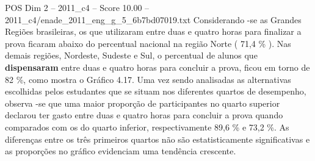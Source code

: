 \begin{textsample}{POS Dim 2 – 2011\_c4 – Score 10.00 – 2011\_c4/enade\_2011\_eng\_g\_5\_6b7bd07019.txt}
Considerando -se as Grandes Regiões brasileiras, os que utilizaram entre duas e quatro horas para finalizar a prova ficaram abaixo do percentual nacional na região Norte ( 71,4 \% ).
Nas demais regiões, Nordeste, Sudeste e Sul, o percentual de alunos que \textbf{dispensaram} entre duas e quatro horas para concluir a prova, ficou em torno de 82 \%, como mostra o Gráfico 4.17.
Uma vez sendo analisadas as alternativas escolhidas pelos estudantes que se situam nos diferentes quartos de desempenho, observa -se que uma maior proporção de participantes no quarto superior declarou ter gasto entre duas e quatro horas para concluir a prova quando comparados com os do quarto inferior, respectivamente 89,6 \% e 73,2 \%.
As diferenças entre os três primeiros quartos não são estatisticamente significativas e as proporções no gráfico evidenciam uma tendência crescente.

\end{textsample}
